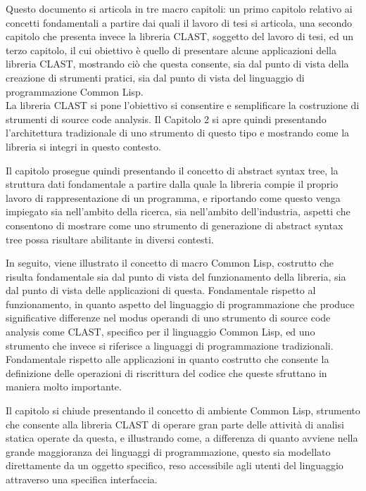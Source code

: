 \documentclass{book}
\begin{document}
Questo documento si articola in tre macro capitoli: un primo capitolo relativo
ai concetti fondamentali a partire dai quali il lavoro di tesi si articola, una
secondo capitolo che presenta invece la libreria CLAST, soggetto del lavoro di
tesi, ed un terzo capitolo, il cui obiettivo è quello di presentare alcune
applicazioni della libreria CLAST, mostrando ciò che questa consente, sia dal
punto di vista della creazione di strumenti pratici, sia dal punto di vista del
linguaggio di programmazione Common Lisp.\\

La libreria CLAST si pone l’obiettivo si consentire e semplificare la
costruzione di strumenti di source code analysis. Il Capitolo 2 si apre quindi
presentando l’architettura tradizionale di uno strumento di questo tipo e
mostrando come la libreria si integri in questo contesto.

Il capitolo prosegue quindi presentando il concetto di abstract syntax tree, la
struttura dati fondamentale a partire dalla quale la libreria compie il proprio
lavoro di rappresentazione di un programma, e riportando come questo venga
impiegato sia nell’ambito della ricerca, sia nell’ambito dell’industria, aspetti
che consentono di mostrare come uno strumento di generazione di abstract syntax
tree possa risultare abilitante in diversi contesti.

In seguito, viene illustrato il concetto di macro Common Lisp, costrutto che
risulta fondamentale sia dal punto di vista del funzionamento della libreria,
sia dal punto di vista delle applicazioni di questa. Fondamentale rispetto al
funzionamento, in quanto aspetto del linguaggio di programmazione che produce
significative differenze nel modus operandi di uno strumento di source code
analysis come CLAST, specifico per il linguaggio Common Lisp, ed uno strumento
che invece si riferisce a linguaggi di programmazione tradizionali. Fondamentale
rispetto alle applicazioni in quanto costrutto che consente la definizione delle
operazioni di riscrittura del codice che queste sfruttano in maniera molto
importante.

Il capitolo si chiude presentando il concetto di ambiente Common Lisp, strumento
che consente alla libreria CLAST di operare gran parte delle attività di analisi
statica operate da questa, e illustrando come, a differenza di quanto avviene
nella grande maggioranza dei linguaggi di programmazione, questo sia modellato
direttamente da un oggetto specifico, reso accessibile agli utenti del
linguaggio attraverso una specifica interfaccia.\\
\end{document}

